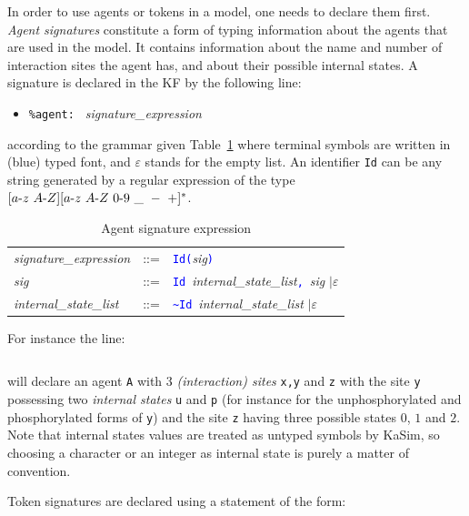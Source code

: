 \documentclass[11pt]{book}
\def\KaSim{\textsf{KaSim}}
\def\sep{\hbox{-}}
\def\intstate{\textasciitilde}
\def\tcb#1{\textcolor{blue}{\ttt{#1}}}
\def\ttt#1{\texttt{#1}}
\def\ITE#1{\begin{itemize}#1\end{itemize}}
\begin{document}
In order to use agents or tokens in a model, one needs to declare them
first. \emph{Agent signatures} constitute a
form of typing information about the agents that are used in the
model. It contains information about the name and number of
interaction sites the agent has, and about their possible internal
states. A signature is declared in the
KF by the following line: \ITE{
\item[] \ttt{\%agent: } \textit{signature\_expression} } according to
the grammar given Table~\ref{tab:sig} where terminal symbols are
written in (blue) typed font, and $\varepsilon$ stands for the empty
list. An identifier \ttt{Id} can be any string generated by a regular
expression of the type $[a\sep z\ A\sep Z][a\sep z\ A \sep Z\ 0\sep
  9\ \_ \ -\ +]^*$.
\begin{table}[htbp]
  \centering
  \caption{Agent signature%
 expression}
  \begin{tabular}{@{} lcl @{}}
    \textit{signature\_expression} & ::= &
    \tcb{Id}\tcb{(}\textit{sig}\tcb{)} \\

    \textit{sig} & ::= &
    \tcb{Id}~\textit{internal\_state\_list}\tcb{,}\ \textit{sig}
    $\mid\varepsilon$ \\

    \textit{internal\_state\_list} & ::= &
    \tcb{\intstate{}Id}~\textit{internal\_state\_list}
    $\mid\varepsilon$
    \end{tabular}
  \label{tab:sig}
\end{table}

For instance the line:
\begin{lstlisting}[language=kappa]
%agent: A(x,y~u~p,z~0~1~2) # Signature of agent A
\end{lstlisting}
will declare an agent \ttt{A} with 3 \emph{(interaction) sites}
\ttt{x,y} and \ttt{z} with the site \ttt{y} possessing two
\emph{internal states} \ttt{u} and \ttt{p} (for
instance for the unphosphorylated and phosphorylated forms of \ttt{y})
and the site \ttt{z} having three possible states $0$, $1$ and
$2$. Note that internal states values are
treated as untyped symbols by \KaSim, so choosing a character or an
integer as internal state is purely a matter of convention.

Token signatures are declared using a statement
of the form:
\begin{lstlisting}[language=kappa]
%token: ca+ # Signature of calcium token
\end{lstlisting}
\end{document}
